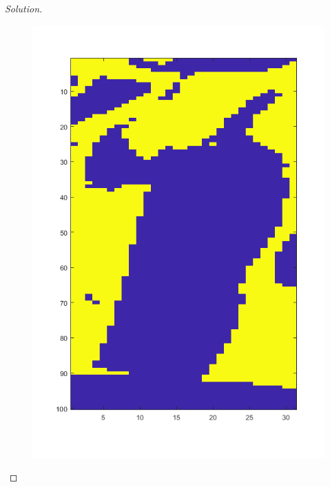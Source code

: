\documentclass[10pt]{article}
\begin{document}
\begin{proof}[Solution]
\begin{figure}[H]
\begin{minipage}{.5\textwidth}
  \label{fig:test1}
\end{minipage}%
\begin{minipage}{.5\textwidth}
  \centering
  \includegraphics[width=\linewidth]{pepper_sigma_01}
  \label{fig:test2}
\end{minipage}
\end{figure}


\end{proof}
\end{document}
